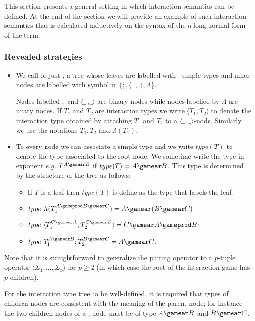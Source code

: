 This section presents a general setting in which interaction semantics can be defined.
At the end of the section we will provide an example of such interaction semantics that is
calculated inductively on the syntax of the $\eta$-long normal form of the term.

\subsubsection{Revealed strategies}

\begin{definition} \hfill
\begin{itemize}
\item We call  or just ,
a tree whose leaves are labelled with \pcf\ simple types and
inner nodes are labelled with symbol in $\{ ;, \langle \_\ ,\_
\rangle, \Lambda \}$.


Nodes labelled $;$ and $\langle \_\ ,\_ \rangle$ are binary
nodes while nodes labelled by $\Lambda$ are unary nodes. If
$T_1$ and $T_2$ are interaction types we write $\langle T_1, T_2
\rangle$ to denote the interaction type obtained by attaching
$T_1$ and $T_2$ to a $\langle \_\ ,\_ \rangle$-node. Similarly
we use the notations $T_1 ; T_2$ and $\Lambda(T_1)$.

\item To every node we can associate a simple type and we write
    $type(T)$ to denote the type associated to the root node. We
    sometime write the type in exponent {\it e.g.} $T^{A\gamear
    B}$ if $type(T) = A\gamear B$. This type is determined by
    the structure of the tree as follows:
    \begin{itemize}
    \item If $T$ is a leaf then $type(T)$ is define as the type that labels the leaf;

    \item $type\ \Lambda(T_1^{A \gameprod B \gamear C}) = A \gamear (B \gamear C)$

    \item $type\ \langle T_1^{C \gamear A} , T_2^{C \gamear B} \rangle =
    C \gamear A \gameprod B$;

    \item $type\ T_1^{A \gamear B};T_2^{B \gamear C} = A \gamear C$.
    \end{itemize}

\end{itemize}
Note that it is straightforward to generalize the pairing operator to a $p$-tuple operator $\langle \Sigma_1, \ldots, \Sigma_p \rangle$ for $p\geq2$ (in which case the root of the interaction game has $p$ children).

For the interaction type tree to be well-defined, it is required
that types of children nodes are consistent with the meaning of the
parent node; for instance the two children nodes of a ;-node must be
of type $A\gamear B$ and $B\gamear C$.

\end{definition}


